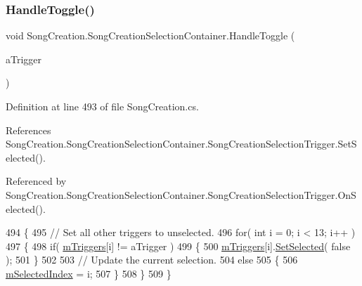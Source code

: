 \subsubsection{\texorpdfstring{Handle\+Toggle()}{HandleToggle()}}
{\footnotesize\ttfamily void Song\+Creation.\+Song\+Creation\+Selection\+Container.\+Handle\+Toggle (\begin{DoxyParamCaption}\item[{\hyperlink{group___s_c_handlers_class_song_creation_1_1_song_creation_selection_container_1_1_song_creation_selection_trigger}{Song\+Creation\+Selection\+Trigger}}]{a\+Trigger }\end{DoxyParamCaption})\hspace{0.3cm}{\ttfamily [private]}}



Definition at line 493 of file Song\+Creation.\+cs.



References Song\+Creation.\+Song\+Creation\+Selection\+Container.\+Song\+Creation\+Selection\+Trigger.\+Set\+Selected().



Referenced by Song\+Creation.\+Song\+Creation\+Selection\+Container.\+Song\+Creation\+Selection\+Trigger.\+On\+Selected().


\begin{DoxyCode}
494         \{
495             \textcolor{comment}{// Set all other triggers to unselected.}
496             \textcolor{keywordflow}{for}( \textcolor{keywordtype}{int} i = 0; i < 13; i++ )
497             \{
498                 \textcolor{keywordflow}{if}( \hyperlink{group___s_c_handlers_ga89fbb92f878e65f27bee6edbf920da22}{mTriggers}[i] != aTrigger )
499                 \{
500                     \hyperlink{group___s_c_handlers_ga89fbb92f878e65f27bee6edbf920da22}{mTriggers}[i].\hyperlink{group___s_c_handlers_ga477673c43fb3b828ed54d06d00e93f08}{SetSelected}( \textcolor{keyword}{false} );
501                 \}
502 
503                 \textcolor{comment}{// Update the current selection.}
504                 \textcolor{keywordflow}{else}
505                 \{
506                     \hyperlink{group___s_c_handlers_ga33015c7ac7e8cebb24b1fc97c70b4ed7}{mSelectedIndex} = i;
507                 \}
508             \}
509         \}
\end{DoxyCode}
\mbox{\label{group___s_c_handlers_ga867d521ac1d7184636c40dad3ebd43b0}} 
